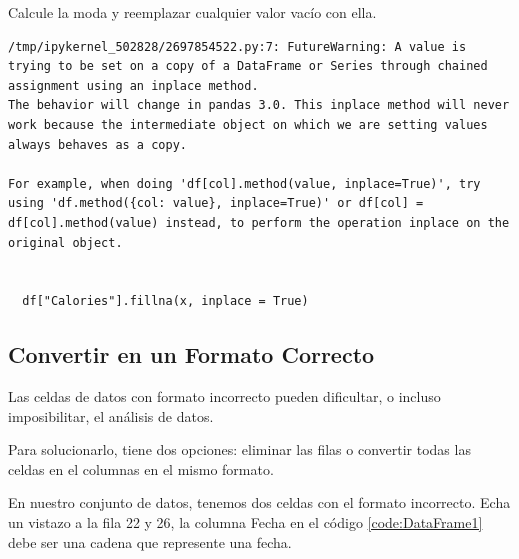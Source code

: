 \begin{code} Calcule la moda y reemplazar cualquier valor vacío con ella.

\begin{Shaded}
\begin{Highlighting}[]

\OperatorTok{=}\NormalTok{)}

\OperatorTok{=}\NormalTok{ df[}\NormalTok{].mode()[}\NormalTok{]}

\NormalTok{df[}\NormalTok{].fillna(x, inplace }\OperatorTok{=} \NormalTok{)}
\end{Highlighting}
\end{Shaded}

\begin{verbatim}
/tmp/ipykernel_502828/2697854522.py:7: FutureWarning: A value is trying to be set on a copy of a DataFrame or Series through chained assignment using an inplace method.
The behavior will change in pandas 3.0. This inplace method will never work because the intermediate object on which we are setting values always behaves as a copy.

For example, when doing 'df[col].method(value, inplace=True)', try using 'df.method({col: value}, inplace=True)' or df[col] = df[col].method(value) instead, to perform the operation inplace on the original object.


  df["Calories"].fillna(x, inplace = True)
\end{verbatim}
\end{code}


\subsection{Convertir en un Formato Correcto}

Las celdas de datos con formato incorrecto pueden dificultar, o incluso
imposibilitar, el análisis de datos.

Para solucionarlo, tiene dos opciones: eliminar las filas o convertir
todas las celdas en el columnas en el mismo formato.


En nuestro conjunto de datos, tenemos dos celdas con el formato
incorrecto. Echa un vistazo a la fila 22 y 26, la columna
\textquotesingle Fecha\textquotesingle{} en el código \ref{code:DataFrame1} debe ser una cadena que
represente una fecha.\\

